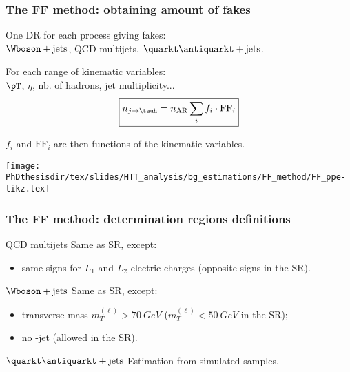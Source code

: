 \begin{frame}
\frametitle{The FF method: obtaining amount of fakes}

\begin{minipage}[c]{.45\textwidth}
\manip One DR for each process giving fakes:\\$\Wboson+\text{jets}$, QCD multijets, $\quarkt\antiquarkt+\text{jets}$.

\manip For each range of kinematic variables:\\
\qquad $\pT$, $\eta$, nb. of hadrons, jet multiplicity...
\begin{equation*}
\boxed{n_{j\to\tauh} = n_\text{AR}\sum_i f_i \cdot \mathrm{FF}_i}
\end{equation*}

\manip $f_i$ and $\mathrm{FF}_i$ are then functions of the kinematic variables.
\end{minipage}
\hfill
\begin{minipage}[c]{.45\textwidth}
\vspace{\graphh}
\end{minipage}
\begin{minipage}[c]{.45\textwidth}
\begin{center}
\texttt{[image: \\PhDthesisdir/tex/slides/HTT\_analysis/bg\_estimations/FF\_method/FF\_ppe-tikz.tex]}
\end{center}
\end{minipage}
\end{frame}

\begin{frame}
\frametitle{The FF method: determination regions definitions}

\begin{block}{QCD multijets}
Same as SR, except:
\begin{itemize}
\item same signs for $L_1$ and $L_2$ electric charges (opposite signs in the SR).
\end{itemize}
\end{block}

\pause\vfill

\begin{block}{$\Wboson+\text{jets}$}
Same as SR, except:
\begin{itemize}
\item transverse mass $m_T^{(\ell)}>\SI{70}{GeV}$ ($m_T^{(\ell)}<\SI{50}{GeV}$ in the SR);
\item no \quarkb-jet (allowed in the SR).
\end{itemize}
\end{block}

\pause\vfill

\begin{block}{$\quarkt\antiquarkt+\text{jets}$}
Estimation from simulated samples.
\end{block}

\end{frame}

